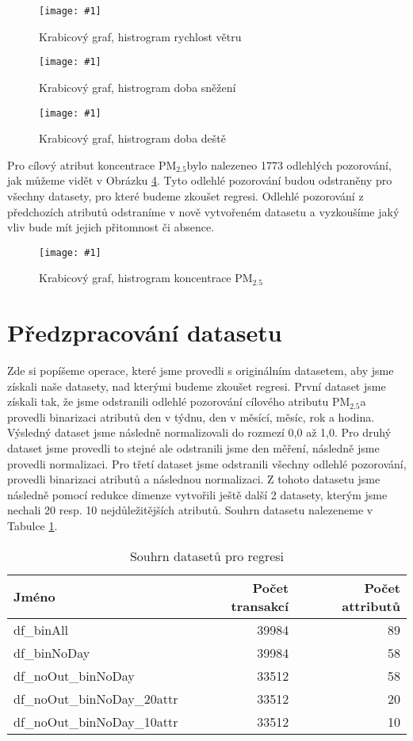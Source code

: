 \documentclass[a4paper,12pt]{article}
\newcommand{\pmQuant}[0]{$\text{PM}_{2.5}$}
\newcommand{\image}[4]{\begin{figure}[ht!] \centering \texttt{[image: \#1]} \caption{#2} \label{#3} \end{figure}}
\begin{document}
\image{wndspd.pdf}{Krabicový graf, histrogram rychlost větru}{fig:wndspeed_analys}{0.8}
\image{hsnow.pdf}{Krabicový graf, histrogram doba sněžení}{fig:hsnow_analys}{0.8}
\image{hrain.pdf}{Krabicový graf, histrogram doba deště}{fig:hrain_analys}{0.8}

Pro cílový atribut koncentrace \pmQuant bylo nalezeneo 1773 odlehlých pozorování, jak můžeme vidět v Obrázku \ref{fig:pm25_analys}.
Tyto odlehlé pozorování budou odstraněny pro všechny datasety, pro které budeme zkoušet regresi.
Odlehlé pozorování z předchozích atributů odstraníme v nově vytvořeném datasetu a vyzkoušíme jaký vliv
bude mít jejich přitomnost či absence. 

\image{pm25.pdf}{Krabicový graf, histrogram koncentrace \pmQuant}{fig:pm25_analys}{0.8}

\section{Předzpracování datasetu}
Zde si popíšeme operace, které jsme provedli s originálním datasetem, aby jsme získali naše datasety, nad kterými budeme
zkoušet regresi. 
První dataset jsme získali tak, že jsme odstranili odlehlé pozorování cílového atributu \pmQuant a provedli binarizaci atributů
den v týdnu, den v měsící, měsíc, rok a hodina. Výsledný dataset jsme následně normalizovali do rozmezí 0,0 až 1,0.
Pro druhý dataset jsme provedli to stejné ale odstranili jsme den měření, následně jsme provedli normalizaci.
Pro třetí dataset jsme odstranili všechny odlehlé pozorování, provedli binarizaci atributů a následnou normalizaci.
Z tohoto datasetu jsme následně pomocí redukce dimenze vytvořili ještě další 2 datasety, kterým jsme nechali 20 resp. 10
nejdůležitějších atributů. Souhrn datasetu nalezeneme v Tabulce \ref{tab:regression_datasets}.

\begin{table}
    \centering
    \begin{tabular}{l | r | r}
        Jméno                       & Počet transakcí   & Počet attributů \\\hline\hline
        df\_binAll                   & 39984             & 89 \\
        df\_binNoDay                 & 39984             & 58 \\
        df\_noOut\_binNoDay           & 33512             & 58 \\
        df\_noOut\_binNoDay\_20attr    & 33512             & 20 \\  
        df\_noOut\_binNoDay\_10attr    & 33512             & 10 \\
    \end{tabular}
    \caption{Souhrn datasetů pro regresi}
    \label{tab:regression_datasets}
\end{table}
\end{document}
